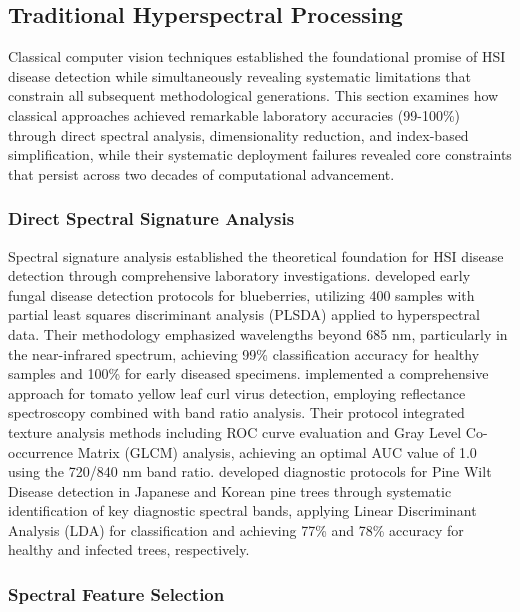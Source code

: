 \documentclass[sn-mathphys]{sn-jnl}
\theoremstyle{thmstyleone}%
\theoremstyle{thmstyletwo}%
\theoremstyle{thmstylethree}%
\begin{document}
\subsection{Traditional Hyperspectral Processing}
Classical computer vision techniques established the foundational promise of HSI disease detection while simultaneously revealing systematic limitations that constrain all subsequent methodological generations. This section examines how classical approaches achieved remarkable laboratory accuracies (99-100\%) through direct spectral analysis, dimensionality reduction, and index-based simplification, while their systematic deployment failures revealed core constraints that persist across two decades of computational advancement.

\subsubsection{Direct Spectral Signature Analysis}
Spectral signature analysis established the theoretical foundation for HSI disease detection through comprehensive laboratory investigations. \citet{huang2020measurement} developed early fungal disease detection protocols for blueberries, utilizing 400 samples with partial least squares discriminant analysis (PLSDA) applied to hyperspectral data. Their methodology emphasized wavelengths beyond 685 nm, particularly in the near-infrared spectrum, achieving 99\% classification accuracy for healthy samples and 100\% for early diseased specimens. \citet{lu2018using} implemented a comprehensive approach for tomato yellow leaf curl virus detection, employing reflectance spectroscopy combined with band ratio analysis. Their protocol integrated texture analysis methods including ROC curve evaluation and Gray Level Co-occurrence Matrix (GLCM) analysis, achieving an optimal AUC value of 1.0 using the 720/840 nm band ratio. \citet{li2022classification} developed diagnostic protocols for Pine Wilt Disease detection in Japanese and Korean pine trees through systematic identification of key diagnostic spectral bands, applying Linear Discriminant Analysis (LDA) for classification and achieving 77\% and 78\% accuracy for healthy and infected trees, respectively.


\subsubsection{Spectral Feature Selection}
\end{document}
